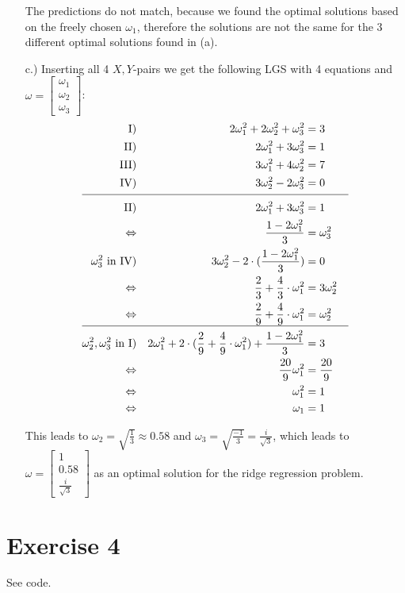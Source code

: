 \documentclass[%
   10pt,              %
   a4paper,           %
   DIV10,             %
]{scrartcl}%
\begin{document}
\begin{itemize}
	\noindent The predictions do not match, because we found the optimal solutions based on the freely chosen $\omega_1$, therefore the solutions are not the same for the 3 different optimal solutions found in (a).
	\item[c.)] Inserting all 4 $X, Y$-pairs we get the following LGS with 4 equations and $\omega = \begin{bmatrix}
	\omega_1\\
	\omega_2\\
	\omega_3
	\end{bmatrix}$:\newline\noindent
	\begin{align*}
	\text{I)} && 2\omega_1^2 + 2\omega_2^2 + \omega_3^2 &= 3 &&\\
	\text{II)} && 2\omega_1^2 + 3\omega_3^2&= 1 &&\\
	\text{III)} && 3\omega_1^2 + 4\omega_2^2&= 7 &&\\
	\text{IV)} && 3\omega_2^2 - 2\omega_3^2&= 0 &&\\[-1.7ex]
	\cline{1-6}
	\text{II)} && 2\omega_1^2 + 3\omega_3^2&=1&&\\
	\text{$\Leftrightarrow$} && \frac{1 - 2\omega_1^2}{3}&= \omega_3^2\\
	\text{$\omega_3^2$ in IV)} && 3\omega_2^2 - 2 \cdot (\frac{1 - 2\omega_1^2}{3})&= 0\\
	\text{$\Leftrightarrow$} && \frac{2}{3} + \frac{4}{3} \cdot \omega_1^2&= 3\omega_2^2\\
	\text{$\Leftrightarrow$} && \frac{2}{9} + \frac{4}{9} \cdot \omega_1^2&= \omega_2^2&&\\[-1.7ex]
	\cline{1-6}
	\text{$\omega_2^2, \omega_3^2$ in I)} &&  2\omega_1^2 + 2 \cdot (\frac{2}{9} + \frac{4}{9} \cdot \omega_1^2) + \frac{1 - 2\omega_1^2}{3}&= 3\\
	\text{$\Leftrightarrow$} && \frac{20}{9} \omega_1^2&=\frac{20}{9}\\
	\text{$\Leftrightarrow$} && \omega_1^2&= 1\\
	\text{$\Leftrightarrow$} && \omega_1&= 1\\
	\end{align*} 
	
	\noindent This leads to $\omega_2 = \sqrt{\frac{1}{3}} \approx 0.58$ and $\omega_3 = \sqrt{\frac{-1}{3}} = \frac{i}{\sqrt{3}}$, which leads to $\omega = \begin{bmatrix}
	1\\
	0.58\\
	\frac{i}{\sqrt{3}}
	\end{bmatrix}$ as an optimal solution for the ridge regression problem.
\end{itemize}

\section*{Exercise 4}
See code. 
\end{document}
